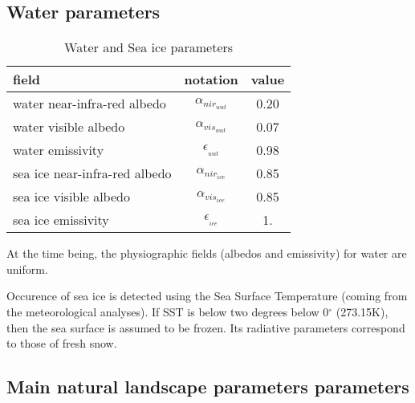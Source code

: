 \newpage

\subsection{Water parameters}

\begin{table}[h]
\hspace*{4.cm}
\begin{tabular}{||l|c|c||}
\hline
\hline
field & notation & value \\
\hline
\hline
water near-infra-red albedo & $\alpha_{{nir}_{wat}}$ & 0.20 \\
water visible albedo & $\alpha_{{vis}_{wat}}$ & 0.07 \\
water emissivity & $\epsilon_{_{wat}}$ & 0.98 \\
\hline
sea ice near-infra-red albedo & $\alpha_{{nir}_{ice}}$ & 0.85 \\
sea ice visible albedo & $\alpha_{{vis}_{ice}}$ & 0.85 \\
sea ice emissivity & $\epsilon_{_{ice}}$ & 1. \\
\hline
\hline
\end{tabular}
\caption{Water and Sea ice parameters
\label{water}}
\end{table}

At the time being, the physiographic fields (albedos and emissivity)
for water are uniform.

Occurence of sea ice is detected using the
Sea Surface Temperature (coming from the meteorological analyses).
If SST is below two degrees below 0$^\circ$ (273.15K), then the
sea surface is assumed to be frozen. Its radiative parameters correspond
to those of fresh snow.



\subsection{Main natural landscape parameters parameters}

